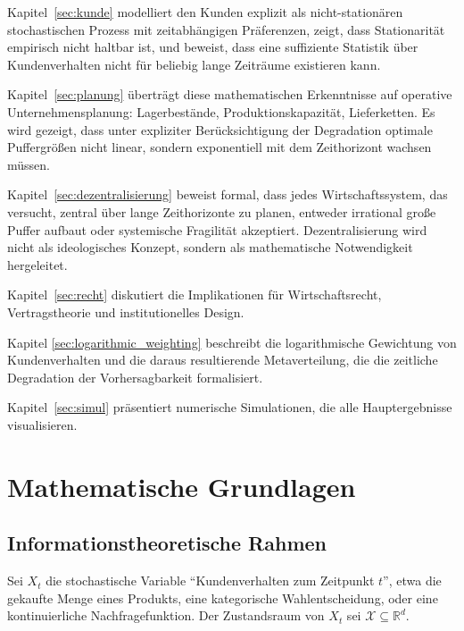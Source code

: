 \documentclass[12pt, a4paper, titlepage]{report}
\theoremstyle{definition}
\theoremstyle{remark}
\newcommand{\R}{\mathbb{R}}
\begin{document}
Kapitel~\ref{sec:kunde} modelliert den Kunden explizit als nicht-stationären stochastischen Prozess mit zeitabhängigen Präferenzen, zeigt, dass Stationarität empirisch nicht haltbar ist, und beweist, dass eine suffiziente Statistik über Kundenverhalten nicht für beliebig lange Zeiträume existieren kann.

Kapitel~\ref{sec:planung} überträgt diese mathematischen Erkenntnisse auf operative Unternehmensplanung: Lagerbestände, Produktionskapazität, Lieferketten. Es wird gezeigt, dass unter expliziter Berücksichtigung der Degradation optimale Puffergrößen nicht linear, sondern exponentiell mit dem Zeithorizont wachsen müssen.

Kapitel~\ref{sec:dezentralisierung} beweist formal, dass jedes Wirtschaftssystem, das versucht, zentral über lange Zeithorizonte zu planen, entweder irrational große Puffer aufbaut oder systemische Fragilität akzeptiert. Dezentralisierung wird nicht als ideologisches Konzept, sondern als mathematische Notwendigkeit hergeleitet.

Kapitel~\ref{sec:recht} diskutiert die Implikationen für Wirtschaftsrecht, Vertragstheorie und institutionelles Design. 

Kapitel \ref{sec:logarithmic_weighting} beschreibt die logarithmische Gewichtung von Kundenverhalten und die daraus resultierende Metaverteilung, die die zeitliche Degradation der Vorhersagbarkeit formalisiert.

Kapitel~\ref{sec:simul} präsentiert numerische Simulationen, die alle Hauptergebnisse visualisieren.

\chapter{Mathematische Grundlagen}
\label{sec:grundlagen}

\section{Informationstheoretische Rahmen}

Sei $X_t$ die stochastische Variable ``Kundenverhalten zum Zeitpunkt $t$'', etwa die gekaufte Menge eines Produkts, eine kategorische Wahlentscheidung, oder eine kontinuierliche Nachfragefunktion. Der Zustandsraum von $X_t$ sei $\mathcal{X} \subseteq \R^d$.
\end{document}
